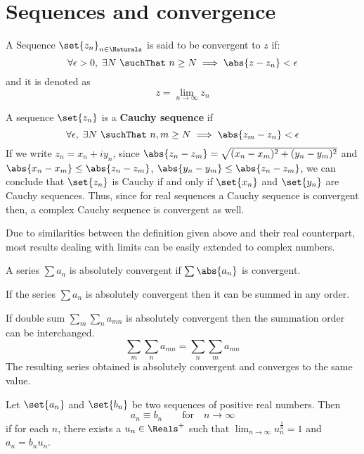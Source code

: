 \section{Sequences and convergence}
A Sequence \(\set{z_n}_{n \in \Naturals}\) is said to be convergent to \(z\) if:
\begin{equation*} 
      \forall \epsilon > 0 , \; \exists N \ \suchThat \ n \geq N \implies \abs{z - z_n} < \epsilon
\end{equation*}
and it is denoted as 
\begin{equation*}
      z = \lim_{n \to \infty} z_n
\end{equation*}

A sequence \(\set{z_n}\) is a \textbf{Cauchy sequence} if 
\begin{equation*}
      \forall \epsilon, \; \exists N \ \suchThat \ n,m \geq N \implies \abs{z_m - z_n} < \epsilon
\end{equation*}
If we write \(z_n = x_n + iy_n\), since \(\abs{z_n - z_m} = \sqrt{(x_n - x_m)^2 + (y_n - y_m)^2}\) and \(\abs{x_n - x_m}\leq \abs{z_n - z_m} \), \( \abs{y_n - y_m} \leq \abs{z_n - z_m}\), we can conclude that \(\set{z_n}\) is Cauchy if and only if \(\set{x_n}\) and \(\set{y_n}\) are Cauchy sequences. Thus, since for real sequences a Cauchy sequence is convergent then, a complex Cauchy sequence is convergent as well.

Due to similarities between the definition given above and their real counterpart, most results dealing with limits can be easily extended to complex numbers.

A series \(\sum a_n\) is absolutely convergent if \(\sum \abs{a_n}\) is convergent. 
\begin{proposition}
      If the series \(\sum a_n\) is absolutely convergent then it can be summed in any order.
\end{proposition}

\begin{proposition}
      If double sum \(\sum_m \sum_n a_{mn}\) is absolutely convergent then the summation order can be interchanged. 
      \begin{equation*}
            \sum_{m} \sum_n a_{mn} = \sum_n \sum_m a_{mn}
      \end{equation*}
      The resulting series obtained is absolutely convergent and converges to the same value.
\end{proposition}

\begin{definition}
      Let \(\set{a_n}\) and \(\set{b_n}\) be two sequences of positive real numbers. Then 
      \begin{equation*}
            a_n \equiv b_n \qquad \text{for} \quad n \to \infty
      \end{equation*} 
      if for each \(n\), there exists a \(u_n \in \Reals^+\) such that \(\lim_{n \to \infty} u_n^{\frac{1}{n}} = 1\) and \(a_n = b_n u_n\).
\end{definition}

